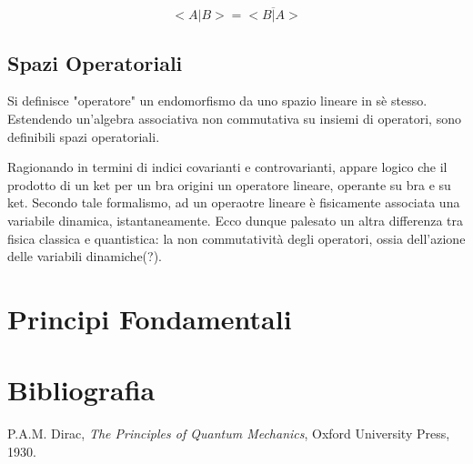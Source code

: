 \documentclass{article}
\begin{document}
\begin{equation}
    <A|B> = \overline{<B|A>}
\end{equation}

\subsection{Spazi Operatoriali}

Si definisce "operatore" un endomorfismo da uno spazio lineare in sè stesso.
Estendendo un'algebra associativa non commutativa su insiemi di operatori, sono definibili spazi operatoriali.

Ragionando in termini di indici covarianti e controvarianti, appare logico che il prodotto di un ket per un bra origini un operatore lineare, operante su bra e su ket.
Secondo tale formalismo, ad un operaotre lineare è fisicamente associata una variabile dinamica, istantaneamente.
Ecco dunque palesato un altra differenza tra fisica classica e quantistica: la non commutatività degli operatori, ossia dell'azione delle variabili dinamiche(?).



\section{Principi Fondamentali}
\section{Bibliografia}
\begin{thebibliography}{9}
     P.A.M. Dirac, \emph{The Principles of Quantum Mechanics}, Oxford University Press, 1930.
\end{thebibliography}
\end{document}

